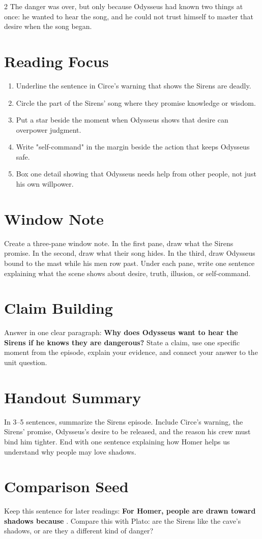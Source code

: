 \documentclass[12pt]{article}
\begin{document}
\begin{multicols}{2}
The danger was over, but only because Odysseus had known two things at once: he wanted to hear the song, and he could not trust himself to master that desire when the song began.

\section*{Reading Focus}
\begin{enumerate}[leftmargin=*, itemsep=0.2em]
\item Underline the sentence in Circe's warning that shows the Sirens are deadly.
\item Circle the part of the Sirens' song where they promise knowledge or wisdom.
\item Put a star beside the moment when Odysseus shows that desire can overpower judgment.
\item Write "self-command" in the margin beside the action that keeps Odysseus safe.
\item Box one detail showing that Odysseus needs help from other people, not just his own willpower.
\end{enumerate}

\section*{Window Note}
Create a three-pane window note. In the first pane, draw what the Sirens promise. In the second, draw what their song hides. In the third, draw Odysseus bound to the mast while his men row past. Under each pane, write one sentence explaining what the scene shows about desire, truth, illusion, or self-command.

\section*{Claim Building}
Answer in one clear paragraph: \textbf{Why does Odysseus want to hear the Sirens if he knows they are dangerous?} State a claim, use one specific moment from the episode, explain your evidence, and connect your answer to the unit question.

\section*{Handout Summary}
In 3--5 sentences, summarize the Sirens episode. Include Circe's warning, the Sirens' promise, Odysseus's desire to be released, and the reason his crew must bind him tighter. End with one sentence explaining how Homer helps us understand why people may love shadows.

\section*{Comparison Seed}
Keep this sentence for later readings: \textbf{For Homer, people are drawn toward shadows because} \underline{\hspace{1.8in}}. Compare this with Plato: are the Sirens like the cave's shadows, or are they a different kind of danger?

\end{multicols}
\end{document}
